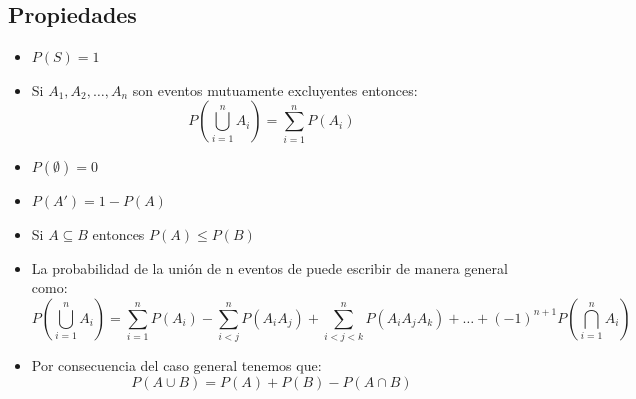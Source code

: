 \documentclass[12pt, fleqn]{report}                             %
\theoremstyle{break}                                            %
\newcommand{\Wrap}[1]           {\left( #1 \right)}             %
\begin{document}
            \clearpage
            \subsection{Propiedades}

                \begin{itemize}
                    \item
                        $P(S) = 1$
                    
                    \item
                        Si $A_1, A_2, \dots, A_n$ son eventos mutuamente excluyentes entonces:
                        \begin{equation*}
                            P\Wrap{\bigcup_{i = 1}^n A_i} 
                                = \sum_{i = 1}^n P(A_i)    
                        \end{equation*}
                    
                    \item 
                        $P(\emptyset) = 0$
                    
                    \item 
                        $P(A') = 1 - P(A)$

                    \item 
                        Si $A \subseteq B$ entonces $P(A) \leq P(B)$

                    \item
                        La probabilidad de la unión de n eventos de puede escribir de manera general como:
                        \begin{equation*}
                            P\Wrap{\bigcup_{i = 1}^n A_i} 
                            = 
                                \sum_{i = 1}^n P(A_i) 
                                - \sum_{i < j}^n P(A_iA_j) 
                                + \sum_{i < j < k}^n P(A_iA_jA_k)
                                + \dots
                                + (-1)^{n+1} P\Wrap{\bigcap_{i = 1}^n A_i}
                        \end{equation*}
                    
                    \item Por consecuencia del caso general tenemos que: 
                        \begin{equation*}
                            P(A \cup B) = P(A) + P(B) - P(A \cap B)   
                        \end{equation*}
                    

\end{itemize}
\end{document}
